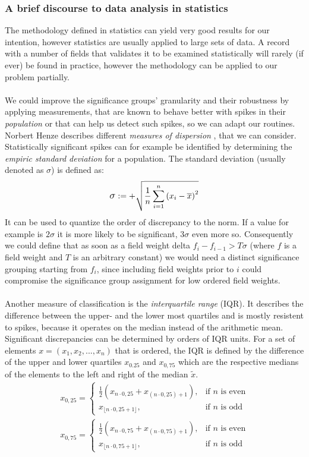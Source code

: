 \subsubsection{A brief discourse to data analysis in statistics}
The methodology defined in statistics can yield very good results for our intention, however statistics are usually applied to large sets of data. A record with a number of fields that validates it to be examined statistically will rarely (if ever) be found in practice, however the methodology can be applied to our problem partially.\\\\
We could improve the significance groups' granularity and their robustness by applying measurements, that are known to behave better with spikes in their \textit{population} or that can help us detect such spikes, so we can adapt our routines. Norbert Henze describes different \textit{measures of dispersion} , that we can consider. Statistically significant spikes can for example be identified by determining the \textit{empiric standard deviation} for a population. The standard deviation (usually denoted as $\sigma$) is defined as:
\begin{align}
\scalemath{1.2}{\sigma} := +\sqrt{\frac{1}{n} \sum \limits_{i=1}^n\left(x_i-\overline x\right)^2}
\end{align}
It can be used to quantize the order of discrepancy to the norm. If a value for example is $2\sigma$ it is more likely to be significant, $3\sigma$ even more so. Consequently we could define that as soon as a field weight delta $f_i-f_{i-1}>T\sigma$ (where $f$ is a field weight and $T$ is an arbitrary constant) we would need a distinct significance grouping starting from $f_i$, since including  field weights prior to $i$ could compromise the significance group assignment for low ordered field weights.\\\\
Another measure of classification is the \textit{interquartile range} (IQR). It describes the difference between the upper- and the lower most quartiles and is mostly resistent to spikes, because it operates on the median instead of the arithmetic mean. Significant discrepancies can be determined by orders of IQR units. For a set of elements $x = (x_1, x_2, ..., x_n)$ that is ordered, the IQR is defined by the difference of the upper and lower quartiles $x_{0.25}$ and $x_{0,75}$ which are the respective medians of the elements to the left and right of the median $\tilde{x}$.
\begin{align}
x_{0{,}25} = \begin{cases}
\tfrac{1}{2}(x_{n \cdot 0{,}25} + x_{(n \cdot 0{,}25) + 1}),  & \text{if }n \text{ is even}\\
x_{\lfloor n \cdot 0{,}25 +1\rfloor}, & \text{if }n \text{ is odd}
\end{cases}\\
x_{0{,}75} = \begin{cases}
\tfrac{1}{2}(x_{n \cdot 0{,}75} + x_{(n \cdot 0{,}75) + 1}),  & \text{if }n \text{ is even}\\
x_{\lfloor n \cdot 0{,}75 +1\rfloor}, & \text{if }n \text{ is odd}
\end{cases}
\end{align}
